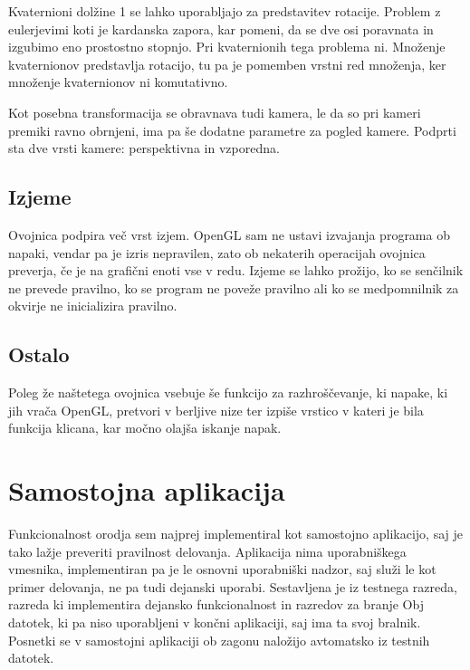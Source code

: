 \documentclass[a4paper, 12pt]{book}
\begin{document}
Kvaternioni dolžine 1 se lahko uporabljajo za predstavitev rotacije. Problem z eulerjevimi koti je kardanska zapora, kar pomeni, da se dve osi poravnata in izgubimo eno prostostno stopnjo. Pri kvaternionih tega problema ni. Množenje kvaternionov predstavlja rotacijo, tu pa je pomemben vrstni red množenja, ker množenje kvaternionov ni komutativno.

Kot posebna transformacija se obravnava tudi kamera, le da so pri kameri premiki ravno obrnjeni, ima pa še dodatne parametre za pogled kamere. Podprti sta dve vrsti kamere: perspektivna in vzporedna.


\subsection{Izjeme}
Ovojnica podpira več vrst izjem. OpenGL sam ne ustavi izvajanja programa ob napaki, vendar pa je izris nepravilen, zato ob nekaterih operacijah ovojnica preverja, če je na grafični enoti vse v redu. Izjeme se lahko prožijo, ko se senčilnik ne prevede pravilno, ko se program ne poveže pravilno ali ko se medpomnilnik za okvirje ne inicializira pravilno.

\subsection{Ostalo}

Poleg že naštetega ovojnica vsebuje še funkcijo za razhroščevanje, ki napake, ki jih vrača OpenGL, pretvori v berljive nize ter izpiše vrstico v kateri je bila funkcija klicana, kar močno olajša iskanje napak.

\section{Samostojna aplikacija}

Funkcionalnost orodja sem najprej implementiral kot samostojno aplikacijo, saj je tako lažje preveriti pravilnost delovanja. Aplikacija nima uporabniškega vmesnika, implementiran pa je le osnovni uporabniški nadzor, saj služi le kot primer delovanja, ne pa tudi dejanski uporabi. Sestavljena je iz testnega razreda, razreda ki implementira dejansko funkcionalnost in razredov za branje Obj datotek, ki pa niso uporabljeni v končni aplikaciji, saj ima ta svoj bralnik. Posnetki se v samostojni aplikaciji ob zagonu naložijo avtomatsko iz testnih datotek.
\end{document}
